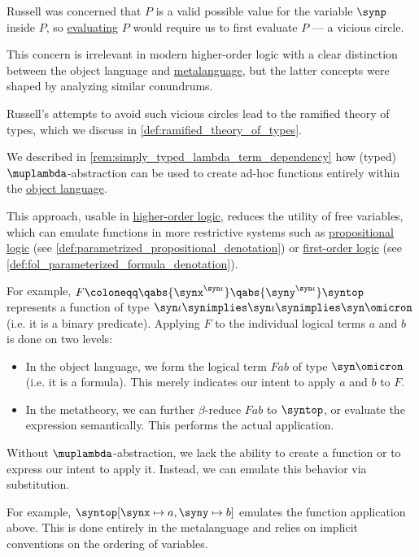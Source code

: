 \begin{remark}
  Russell was concerned that \( P \) is a valid possible value for the variable \( \synp \) inside \( P \), so \hyperref[con:evaluation]{evaluating} \( P \) would require us to first evaluate \( P \) --- a vicious circle.

  This concern is irrelevant in modern higher-order logic with a clear distinction between the object language and \hyperref[con:metalogic]{metalanguage}, but the latter concepts were shaped by analyzing similar conundrums.

  Russell's attempts to avoid such vicious circles lead to the ramified theory of types, which we discuss in \cref{def:ramified_theory_of_types}.
\end{remark}

\begin{remark}\label{rem:hol_parametrized_denotation}
  We described in \cref{rem:simply_typed_lambda_term_dependency} how (typed) \( \muplambda \)-abstraction can be used to create ad-hoc functions entirely within the \hyperref[con:metalanguage]{object language}.

  This approach, usable in \hyperref[def:higher_order_logic]{higher-order logic}, reduces the utility of free variables, which can emulate functions in more restrictive systems such as \hyperref[def:propositional_logic]{propositional logic} (see \cref{def:parametrized_propositional_denotation}) or \hyperref[def:first_order_logic]{first-order logic} (see \cref{def:fol_parameterized_formula_denotation}).

  For example, \( F \coloneqq \qabs {\synx^{\syn\iota}} \qabs {\syny^{\syn\iota}} \syntop \) represents a function of type \( \syn\iota \synimplies \syn\iota \synimplies \syn\omicron \) (i.e. it is a binary predicate). Applying \( F \) to the individual logical terms \( a \) and \( b \) is done on two levels:
  \begin{itemize}
    \item In the object language, we form the logical term \( Fab \) of type \( \syn\omicron \) (i.e. it is a formula). This merely indicates our intent to apply \( a \) and \( b \) to \( F \).

    \item In the metatheory, we can further \( \beta \)-reduce \( Fab \) to \( \syntop \), or evaluate the expression semantically. This performs the actual application.
  \end{itemize}

  Without \( \muplambda \)-abstraction, we lack the ability to create a function or to express our intent to apply it. Instead, we can emulate this behavior via substitution.

  For example, \( \syntop[\synx \mapsto a, \syny \mapsto b] \) emulates the function application above. This is done entirely in the metalanguage and relies on implicit conventions on the ordering of variables.
\end{remark}


